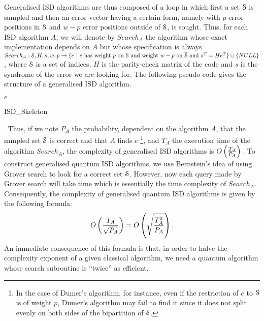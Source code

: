 Generalised ISD algorithms are thus composed of a loop in which first a set $\mathcal{S}$ is sampled and then an error vector having a certain form, namely with $p$ error positions in $\mathcal{S}$ and $w-p$ error positions outside of $\mathcal{S}$, is sought. Thus, 
for each ISD algorithm $A$, we will denote by $Search_A$ the algorithm
 whose exact implementation depends on $A$ but whose specification is always\\
$Search_A : \mathcal{S}, H, s, w, p \rightarrow \{ e ~|~ \text{$e$ has weight $p$ on $\mathcal{S}$ and weight $w-p$ on $\overline{\mathcal{S}}$ and } s^T = He^T\} \cup \{NULL\}$, 
 where $\mathcal{S}$ is a set of indices, $H$ is the parity-check matrix of the code and $s$ is the syndrome of the error we are looking for.
The following pseudo-code gives the structure of a generalised ISD algorithm.\\
\begin{algorithm}[H]
 \DontPrintSemicolon
 \KwRet $e$\;
 \caption{ISD\_Skeleton}
\end{algorithm}
$~$
Thus, if we note $P_A$ the probability, dependent on the algorithm $A$, that the sampled set $\mathcal{S}$ is correct and that $A$ finds $e$
\footnote{In the case of Dumer's algorithm, for instance, even if the restriction of $e$ to $\mathcal{S}$ is of weight $p$, Dumer's algorithm
may fail to find it since it does not split evenly on both sides of the bipartition of $\mathcal{S}$.}, and $T_A$ the execution time of the algorithm $Search_A$, the complexity of generalised ISD algorithms is 
$O\left( \frac{T_A}{P_A} \right).$
To construct generalised quantum ISD algorithms, we use Bernstein's idea of using Grover search to look for a correct set $\mathcal{S}$. 
However, now each query made by Grover search will take time which is essentially the time complexity of $Search_A$.
Consequently, the complexity of generalised quantum ISD algorithms is given by the following formula:
\begin{equation}
\label{eq:T_quant_ISD}
O\left( \frac{T_A}{\sqrt{P_A}} \right) = O\left( \sqrt{\frac{T_A^2}{P_A}} \right).
\end{equation}
An immediate consequence of this formula is that, in order to halve the complexity exponent of a given classical algorithm, we need a quantum algorithm whose search subroutine is ``twice'' as efficient.

